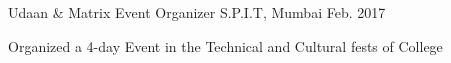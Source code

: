 

\begin{cventries}

  \cventry
    {Udaan \& Matrix} %
    {Event Organizer}%
    {S.P.I.T, Mumbai} %
    {Feb. 2017} %
    {
      \begin{cvitems} %
        \item {Organized a 4-day Event in the Technical and Cultural fests of College}
      \end{cvitems}
    }

\end{cventries}
